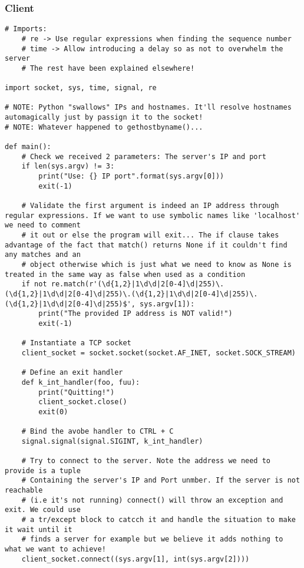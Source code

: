 \documentclass[landscape]{article}
\begin{document}
            \subsubsection{Client}
                \begin{verbatim}
# Imports:
    # re -> Use regular expressions when finding the sequence number
    # time -> Allow introducing a delay so as not to overwhelm the server
    # The rest have been explained elsewhere!

import socket, sys, time, signal, re

# NOTE: Python "swallows" IPs and hostnames. It'll resolve hostnames automagically just by passign it to the socket!
# NOTE: Whatever happened to gethostbyname()...

def main():
    # Check we received 2 parameters: The server's IP and port
    if len(sys.argv) != 3:
        print("Use: {} IP port".format(sys.argv[0]))
        exit(-1)

    # Validate the first argument is indeed an IP address through regular expressions. If we want to use symbolic names like 'localhost' we need to comment
    # it out or else the program will exit... The if clause takes advantage of the fact that match() returns None if it couldn't find any matches and an
    # object otherwise which is just what we need to know as None is treated in the same way as false when used as a condition
    if not re.match(r'(\d{1,2}|1\d\d|2[0-4]\d|255)\.(\d{1,2}|1\d\d|2[0-4]\d|255)\.(\d{1,2}|1\d\d|2[0-4]\d|255)\.(\d{1,2}|1\d\d|2[0-4]\d|255)$', sys.argv[1]):
        print("The provided IP address is NOT valid!")
        exit(-1)

    # Instantiate a TCP socket
    client_socket = socket.socket(socket.AF_INET, socket.SOCK_STREAM)

    # Define an exit handler
    def k_int_handler(foo, fuu):
        print("Quitting!")
        client_socket.close()
        exit(0)

    # Bind the avobe handler to CTRL + C
    signal.signal(signal.SIGINT, k_int_handler)

    # Try to connect to the server. Note the address we need to provide is a tuple
    # Containing the server's IP and Port unmber. If the server is not reachable
    # (i.e it's not running) connect() will throw an exception and exit. We could use
    # a tr/except block to catcch it and handle the situation to make it wait until it
    # finds a server for example but we believe it adds nothing to what we want to achieve!
    client_socket.connect((sys.argv[1], int(sys.argv[2])))


\end{verbatim}
\end{document}
